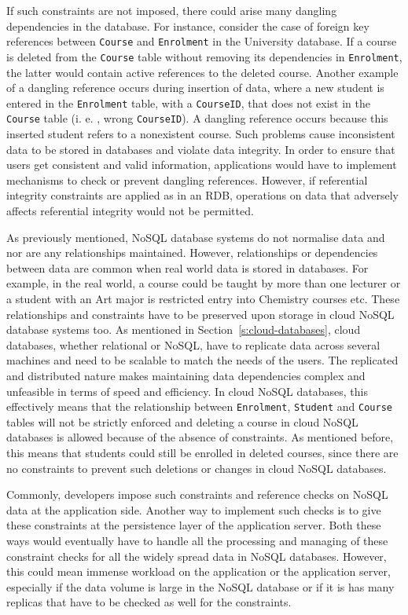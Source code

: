 If such constraints are not imposed,   there could arise many dangling
dependencies in the database.  For instance,   consider the case of foreign key
references between \texttt{Course} and \texttt{Enrolment} in the  University
database.  If a course is deleted from the \texttt{Course} table without
removing its dependencies in \texttt{Enrolment},   the latter would contain
active references to the deleted course.  Another example of a dangling
reference occurs during insertion of data,   where a new student is entered in
the \texttt{Enrolment} table,   with a \texttt{CourseID},   that does not exist
in the \texttt{Course} table (i. e. ,   wrong \texttt{CourseID}).  A dangling
reference occurs because this inserted student refers to a nonexistent course.
Such problems cause inconsistent data to be stored in databases and violate data
integrity.  In order to ensure that users get consistent and valid information,
applications would have to implement mechanisms to check or prevent dangling
references.  However, if referential integrity constraints are applied as in an
\ac{RDB},   operations on data that  adversely affects referential integrity  
would not be permitted.

As previously mentioned,   \ac{NoSQL} database systems do not normalise data and
nor are any relationships maintained.  However, relationships or dependencies
between data are common when real world data is stored in databases.  For
example,   in the real world,   a course could be taught by more than one
lecturer or a student with an Art major is restricted entry into Chemistry
courses etc.  These relationships and constraints have to be preserved upon
storage in cloud \ac{NoSQL} database systems too.  As mentioned in
Section~\ref{s:cloud-databases},   cloud databases,   whether relational or
\ac{NoSQL},   have to replicate data across several machines and need to be
scalable to match the needs of the users.  The replicated and distributed nature
makes maintaining data dependencies complex and unfeasible in terms of speed and
efficiency.  In cloud \ac{NoSQL} databases,   this effectively means that the
relationship between \texttt{Enrolment}, \texttt{Student} and \texttt{Course}
tables will not be strictly enforced and deleting a course in cloud \ac{NoSQL}
databases is allowed because of the absence of constraints.  As mentioned
before,   this means that students could still be enrolled in deleted courses,  
since there are no constraints to prevent such deletions or changes in cloud
\ac{NoSQL} databases.

Commonly,   developers impose such constraints and reference checks on
\ac{NoSQL} data at the application side.  Another way to implement such checks
is to give these constraints at the persistence layer of the application server.
 Both these ways would eventually have to handle all the processing and managing
of these constraint checks for all the widely spread data in \ac{NoSQL}
databases. However,   this could mean immense workload on the application or the
application server,   especially if the data volume is large in the \ac{NoSQL}
database or if it is has many replicas that have to be checked as well for the
constraints.



